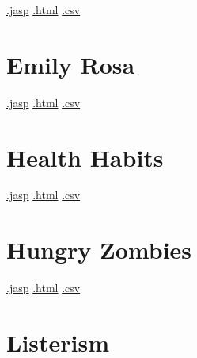 \documentclass[
  letterpaper,
  DIV=11,
  numbers=noendperiod]{scrreprt}
\begin{document}
\textbar{}
\href{https://github.com/jasp-stats/jasp-data-library/raw/main/Death\%20Penalty/Death\%20Penalty.jasp}{.jasp}
\textbar{}
\href{https://htmlpreview.github.io/?https://github.com/jasp-stats/jasp-data-library/blob/main/Death\%20Penalty/index.html}{.html}
\textbar{}
\href{https://raw.githubusercontent.com/jasp-stats/jasp-data-library/main/Death\%20Penalty/Death\%20Penalty.csv}{.csv}

\hypertarget{emily-rosa}{%
\section{Emily Rosa}\label{emily-rosa}}

\textbar{}
\href{https://github.com/jasp-stats/jasp-data-library/raw/main/Emily\%20Rosa/Emily\%20Rosa.jasp}{.jasp}
\textbar{}
\href{https://htmlpreview.github.io/?https://github.com/jasp-stats/jasp-data-library/blob/main/Emily\%20Rosa/index.html}{.html}
\textbar{}
\href{https://raw.githubusercontent.com/jasp-stats/jasp-data-library/main/Emily\%20Rosa/Emily\%20Rosa.csv}{.csv}

\hypertarget{health-habits}{%
\section{Health Habits}\label{health-habits}}

\textbar{}
\href{https://github.com/jasp-stats/jasp-data-library/raw/main/Health\%20Habits/Health\%20Habits.jasp}{.jasp}
\textbar{}
\href{https://htmlpreview.github.io/?https://github.com/jasp-stats/jasp-data-library/blob/main/Health\%20Habits/index.html}{.html}
\textbar{}
\href{https://raw.githubusercontent.com/jasp-stats/jasp-data-library/main/Health\%20Habits/Health\%20Habits.csv}{.csv}

\hypertarget{hungry-zombies}{%
\section{Hungry Zombies}\label{hungry-zombies}}

\textbar{}
\href{https://github.com/jasp-stats/jasp-data-library/raw/main/Hungry\%20Zombies/Hungry\%20Zombies.jasp}{.jasp}
\textbar{}
\href{https://htmlpreview.github.io/?https://github.com/jasp-stats/jasp-data-library/blob/main/Hungry\%20Zombies/index.html}{.html}
\textbar{}
\href{https://raw.githubusercontent.com/jasp-stats/jasp-data-library/main/Hungry\%20Zombies/Hungry\%20Zombies.csv}{.csv}

\hypertarget{listerism}{%
\section{Listerism}\label{listerism}}
\end{document}
